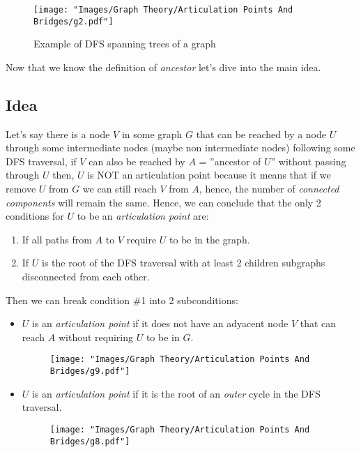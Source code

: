 \begin{figure}[H]
  \centering
  \texttt{[image: "Images/Graph Theory/Articulation Points And Bridges/g2.pdf"]}
  \caption{Example of DFS spanning trees of a graph}
  \label{fig:apb_g2}
\end{figure}

\noindent
Now that we know the definition of \textit{ancestor} let's dive into the main idea.

\subsection*{Idea}

Let's say there is a node $V$ in some graph $G$ that can be reached by a node $U$ through some
intermediate nodes (maybe non intermediate nodes) following some DFS traversal, if $V$ can also be
reached by $A$ = ''ancestor of $U$'' without passing through $U$ then, $U$ is NOT an articulation point
because it means that if we remove $U$ from $G$ we can still reach $V$ from $A$, hence, the number of
\textit{connected components} will remain the same. Hence, we can conclude that the only 2 conditions for
$U$ to be an \textit{articulation point} are:\\

\begin{enumerate}
  \item If all paths from $A$ to $V$ require $U$ to be in the graph.
  \item If $U$ is the root of the DFS traversal with at least 2 children subgraphs disconnected from each other.
\end{enumerate}

\noindent
Then we can break condition \#1 into 2 subconditions:

\begin{itemize}
  \item[\bullet] $U$ is an \textit{articulation point} if it does not have an adyacent node $V$ that can reach $A$ without
        requiring $U$ to be in $G$.
        \begin{figure}[H]
          \centering
          \texttt{[image: "Images/Graph Theory/Articulation Points And Bridges/g9.pdf"]}
          \caption{}
          \label{fig:apb_g9}
        \end{figure}
        \newpage
  \item[\bullet] $U$ is an \textit{articulation point} if it is the root of an \textit{outer} cycle in the DFS traversal.
        \begin{figure}[H]
          \centering
          \texttt{[image: "Images/Graph Theory/Articulation Points And Bridges/g8.pdf"]}
          \caption{}
          \label{fig:apb_g8}
        \end{figure}
\end{itemize}

